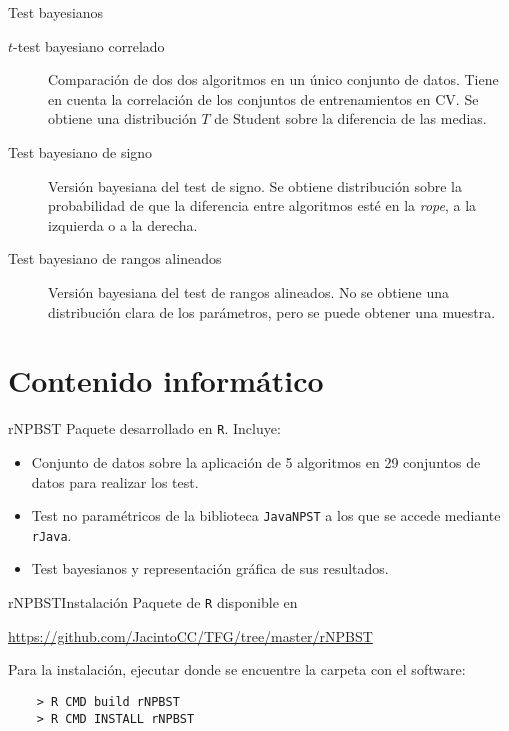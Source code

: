 \documentclass[leqno]{beamer}
\theoremstyle{definition_wo_parentheses}
\begin{document}
\begin{frame}{Test bayesianos}
\begin{description}
\item[$t$-test bayesiano correlado] Comparación de dos
dos algoritmos en un único conjunto de datos. Tiene en cuenta
la correlación de los conjuntos de entrenamientos en CV.
Se obtiene una distribución $T$ de Student sobre la
diferencia de las medias.
\item[Test bayesiano de signo] Versión bayesiana del test de 
signo. Se obtiene distribución sobre la probabilidad de que 
la diferencia entre algoritmos esté en la \textit{rope}, a la 
izquierda o a la derecha.
\item[Test bayesiano de rangos alineados] Versión bayesiana 
del test de rangos alineados. No se obtiene una distribución clara de los parámetros, 
pero se puede obtener una muestra. 
\end{description}
\end{frame}


\section{Contenido informático}

\begin{frame}{rNPBST}
	Paquete desarrollado en \texttt{R}. Incluye:
	
\begin{itemize}
\item Conjunto de datos sobre la aplicación de 5 algoritmos 
	en 29 conjuntos de datos para realizar los test.
\item Test no paramétricos de la biblioteca \texttt{JavaNPST} 
	a los que se accede mediante \texttt{rJava}.
\item Test bayesianos y representación gráfica de 
	sus resultados.
\end{itemize}
\end{frame}

\begin{frame}[fragile]{rNPBST}{Instalación}
Paquete de \texttt{R} disponible en 
\begin{center}
\url{https://github.com/JacintoCC/TFG/tree/master/rNPBST}
\end{center}
Para la instalación, ejecutar donde se encuentre la carpeta con el software:
	\begin{verbatim}
	> R CMD build rNPBST
	> R CMD INSTALL rNPBST
	\end{verbatim}
\end{frame}
\end{document}
